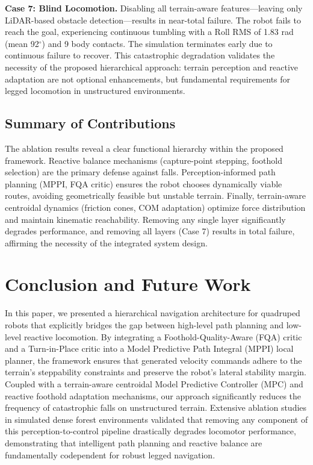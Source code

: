\documentclass[letterpaper, 10 pt, conference]{ieeeconf}  %
\begin{document}
\textbf{Case 7: Blind Locomotion.} Disabling all terrain-aware features—leaving only LiDAR-based obstacle detection—results in near-total failure. The robot fails to reach the goal, experiencing continuous tumbling with a Roll RMS of 1.83 rad (mean 92$^\circ$) and 9 body contacts. The simulation terminates early due to continuous failure to recover. This catastrophic degradation validates the necessity of the proposed hierarchical approach: terrain perception and reactive adaptation are not optional enhancements, but fundamental requirements for legged locomotion in unstructured environments.

\subsection{Summary of Contributions}
The ablation results reveal a clear functional hierarchy within the proposed framework. Reactive balance mechanisms (capture-point stepping, foothold selection) are the primary defense against falls. Perception-informed path planning (MPPI, FQA critic) ensures the robot chooses dynamically viable routes, avoiding geometrically feasible but unstable terrain. Finally, terrain-aware centroidal dynamics (friction cones, COM adaptation) optimize force distribution and maintain kinematic reachability. Removing any single layer significantly degrades performance, and removing all layers (Case 7) results in total failure, affirming the necessity of the integrated system design.

\section{Conclusion and Future Work}
\label{sec:conclusion}

In this paper, we presented a hierarchical navigation architecture for quadruped robots that explicitly bridges the gap between high-level path planning and low-level reactive locomotion. By integrating a Foothold-Quality-Aware (FQA) critic and a Turn-in-Place critic into a Model Predictive Path Integral (MPPI) local planner, the framework ensures that generated velocity commands adhere to the terrain's steppability constraints and preserve the robot's lateral stability margin. Coupled with a terrain-aware centroidal Model Predictive Controller (MPC) and reactive foothold adaptation mechanisms, our approach significantly reduces the frequency of catastrophic falls on unstructured terrain. Extensive ablation studies in simulated dense forest environments validated that removing any component of this perception-to-control pipeline drastically degrades locomotor performance, demonstrating that intelligent path planning and reactive balance are fundamentally codependent for robust legged navigation.
\end{document}
